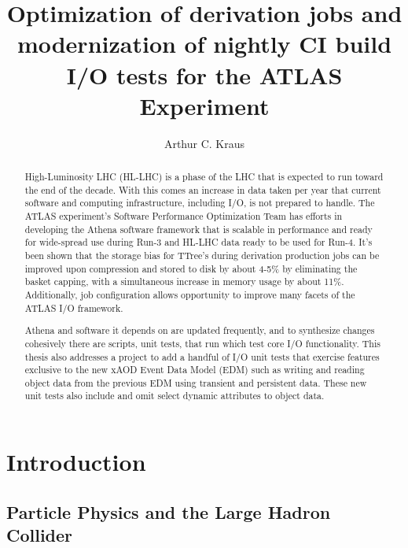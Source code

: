 \documentclass[12pt]{niuthesis}
\title{Optimization of derivation jobs and modernization of nightly CI build I/O tests for the ATLAS Experiment}
\author{Arthur C. Kraus}
\begin{document}
\begin{abstract}
High-Luminosity LHC (HL-LHC) is a phase of the LHC that is expected to run toward the end of the decade. With this comes an increase in data taken per year that current software and computing infrastructure, including I/O, is not prepared to handle. 
The ATLAS experiment's Software Performance Optimization Team has efforts in developing the Athena software framework that is scalable in performance and ready for wide-spread use during Run-3 and HL-LHC data ready to be used for Run-4. 
It's been shown that the storage bias for TTree's during derivation production jobs can be improved upon compression and stored to disk by about 4-5\% by eliminating the basket capping, with a simultaneous increase in memory usage by about 11\%. 
Additionally, job configuration allows opportunity to improve many facets of the ATLAS I/O framework.

Athena and software it depends on are updated frequently, and to synthesize changes cohesively there are scripts, unit tests, that run which test core I/O functionality. 
This thesis also addresses a project to add a handful of I/O unit tests that exercise features exclusive to the new xAOD Event Data Model (EDM) such as writing and reading object data from the previous EDM using transient and persistent data. 
These new unit tests also include and omit select dynamic attributes to object data. 
\end{abstract}

\begin{dedication}

\end{dedication}

\begin{acknowledgements}

\end{acknowledgements}
\MakeThesisPrologue




\chapter{Introduction}
\section{Particle Physics and the Large Hadron Collider}

\end{document}
